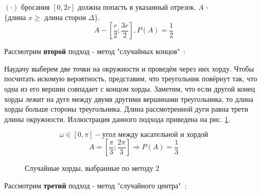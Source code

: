 \begin{exmp}
	$(\cdot)$ бросания $[0, 2r]$ должна попасть в указанный отрезок. $A$ - $\{ \text{длина } x \ge \text{ длина сторон } \Delta \}$.
	\[ A - \left[\dfrac{r}{2}; \dfrac{3r}{2} \right], P(A) = \dfrac{1}{2} \]
	
	Рассмотрим \textbf{второй} подход - метод "случайных концов"\ :
	
	Наудачу выберем две точки на окружности и проведём через них хорду. Чтобы посчитать искомую вероятность, представим, что треугольник повёрнут так, что одна из его вершин совпадает с концом хорды. Заметим, что если другой конец хорды лежит на дуге между двумя другими вершинами треугольника, то длина хорды больше стороны треугольника. Длина рассмотренной дуги равна трети длины окружности. Иллюстрация данного подхода приведена на рис. \ref{img:bertrand2}.
	
	\[ \omega \in [0, \pi] - \text{угол между касательной и хордой} \]
	\[ A = [\dfrac{\pi}{3}; \dfrac{2 \pi}{3}] \Rightarrow P(A) = \dfrac{1}{3} \]
	
	\begin{figure}[h]
		\caption{Случайные хорды, выбранные по методу 2}
		\label{img:bertrand2}
	\end{figure}
	
	Рассмотрим \textbf{третий} подход - метод "случайного центра"\ :
	

\end{exmp}
